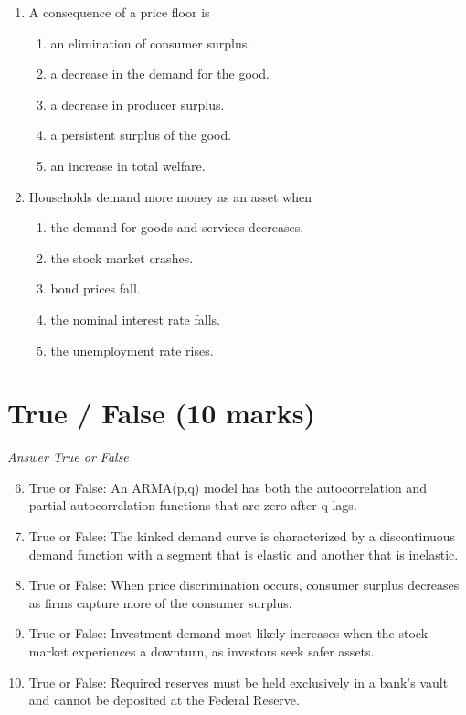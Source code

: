 \documentclass[12pt]{article}
\begin{document}
\begin{enumerate}[label=\arabic*.]
\item A consequence of a price floor is
\begin{enumerate}[label=(\alph*)]
    \item an elimination of consumer surplus.
    \item a decrease in the demand for the good.
    \item a decrease in producer surplus.
    \item a persistent surplus of the good.
    \item an increase in total welfare.
\end{enumerate}
\item Households demand more money as an asset when
\begin{enumerate}[label=(\alph*)]
    \item the demand for goods and services decreases.
    \item the stock market crashes.
    \item bond prices fall.
    \item the nominal interest rate falls.
    \item the unemployment rate rises.
\end{enumerate}
\end{enumerate}

\section*{True / False (10 marks)}
\textit{Answer True or False}
\begin{enumerate}[label=\arabic*.]
\setcounter{enumi}{5}
\item True or False: An ARMA(p,q) model has both the autocorrelation and partial autocorrelation functions that are zero after q lags.
\item True or False: The kinked demand curve is characterized by a discontinuous demand function with a segment that is elastic and another that is inelastic.
\item True or False: When price discrimination occurs, consumer surplus decreases as firms capture more of the consumer surplus.
\item True or False: Investment demand most likely increases when the stock market experiences a downturn, as investors seek safer assets.
\item True or False: Required reserves must be held exclusively in a bank's vault and cannot be deposited at the Federal Reserve.
\end{enumerate}
\end{document}

